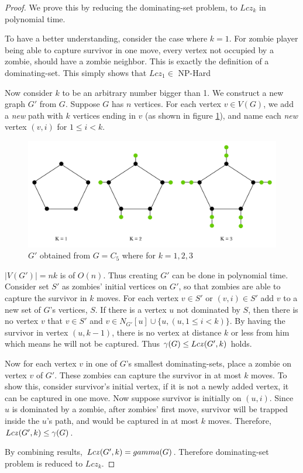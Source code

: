 \documentclass[1p]{elsarticle}
\newcommand{\zn}{\ooalign{$z$\cr\hfil\rule[.5ex]{.2em}{.08ex}\hfil\cr}}
\begin{document}
	\begin{proof}
		We prove this by reducing the dominating-set problem, to $Lcz_k$ in polynomial time.

		To have a better understanding, consider the case where $k=1$. For zombie player being able to capture survivor in
		one move, every vertex not occupied by a zombie, should have a zombie neighbor. This is exactly the definition
		of a dominating-set. This simply shows that $Lcz_1 \in$ NP-Hard 

		Now consider $k$ to be an arbitrary number bigger than 1. We construct a new graph $G'$ from $G$. Suppose $G$
		has $n$ vertices. For each vertex $v \in V(G)$, we add a {\it new} path with $k$ vertices ending in $v$ (as
		shown in figure \ref{fig:p7}), and name each {\it new} vertex $(v,i)$ for $1 \leq i < k$. 

		\begin{figure}[h!]
			\centering
			\includegraphics[width=0.9\linewidth]{fig/LCZ.png}
			\caption{$G'$ obtained from $G = C_5$ where for $k = 1,2,3$}
			\label{fig:p7}
		\end{figure}		


		$|V(G')| = nk$ is of $O(n)$. Thus creating $G'$ can be done in polynomial time. Consider set $S'$ as zombies'
		initial vertices on $G'$, so that zombies are able to capture the survivor in $k$ moves. For each vertex $v \in
		S'$ or $(v,i) \in S'$ add $v$ to a new set of $G$'s vertices, $S$. If there is a vertex $u$ not dominated by
		$S$, then there is no vertex $v$ that $v \in S'$ and $v \in N_{G'}[u] \cup \{u, (u,1 \leq i < k)\}$. By having
		the survivor in vertex $(u, k-1)$, there is no vertex at distance $k$ or less from him which means he will not
		be captured. Thus $\gamma(G) \leq Lc\zn(G',k)$ holds.
		
		Now for each vertex $v$ in one of $G$'s smallest dominating-sets, place a zombie on vertex $v$ of $G'$. These
		zombies can capture the survivor in at most $k$ moves. To show this, consider survivor's initial vertex, if it
		is not a newly added vertex, it can be captured in one move. Now suppose survivor is initially on $(u,i)$. Since
		$u$ is dominated by a zombie, after zombies' first move, survivor will be trapped inside the $u$'s path, and would
		be captured in at most $k$ moves. Therefore, $Lc\zn(G',k) \leq \gamma(G)$.

		By combining results, $Lc\zn(G',k) = gamma(G)$. Therefore dominating-set problem is reduced to $Lcz_k$.

	\end{proof}
\end{document}
